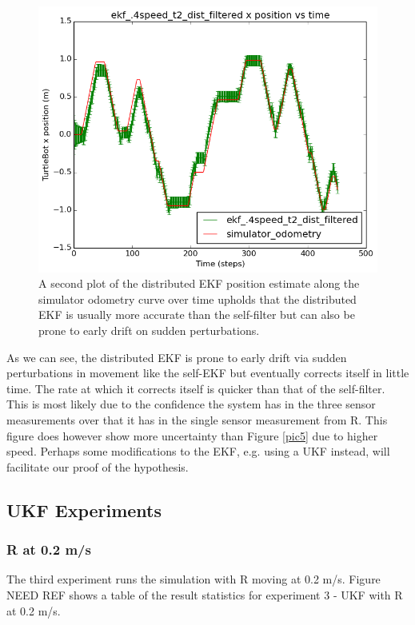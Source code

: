 \documentclass[conference]{IEEEtran} \usepackage[T1]{fontenc} \usepackage[backend=biber, style=ieee]{biblatex}
\begin{document}
\begin{figure}
\centering 
\includegraphics[scale=.45]{ekf_4speed_t2_dist_filtered_pos_err_graph}
\caption {A second plot of the distributed EKF position estimate along the simulator odometry curve over time 
upholds that the distributed EKF is usually more accurate than the self-filter but can also be prone to early drift on sudden 
perturbations.}
\label{pic8} 
\end{figure}

As we can see, the distributed EKF is prone to early drift via sudden perturbations in movement like the self-EKF but 
eventually corrects itself in little time. The rate at which it corrects itself is quicker than that of the self-filter. 
This is most likely due to the confidence the system has in the three sensor measurements over that it has in the single 
sensor measurement from R. This figure does however show more uncertainty than Figure \ref{pic5} due to higher speed. Perhaps some 
modifications to the EKF, e.g. using a UKF instead, will facilitate our proof of the hypothesis.

\subsection{UKF Experiments} \label{UKF Experiments}
\subsubsection{R at 0.2 m/s} \label{UKF .2}
The third experiment runs the simulation with R moving at 0.2 m/s. Figure NEED REF shows a table of the result statistics for experiment 3 - UKF 
with R at 0.2 m/s. 
\end{document}
